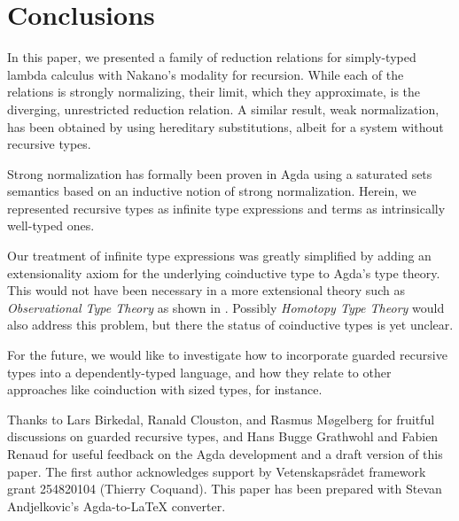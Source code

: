 
\section{Conclusions}
\label{sec:concl}

In this paper, we presented a family of reduction
relations for simply-typed lambda calculus with Nakano's modality for
recursion.  While each of the relations is strongly normalizing, their
limit, which they approximate, is the diverging, unrestricted
reduction relation.  A similar result, weak normalization, has been obtained by
\cite{krishnaswamiBenton:icfp11}
using hereditary substitutions, albeit
for a system without recursive types.

Strong normalization has formally been proven in Agda using a
saturated sets semantics based on an inductive notion of strong
normalization.  Herein, we represented recursive types as infinite
type expressions and terms as intrinsically well-typed ones.

Our treatment of infinite type expressions was greatly simplified by
adding an extensionality axiom for the underlying coinductive type to
Agda's type theory.  This would not have been necessary in a more
extensional theory such as \emph{Observational Type Theory}
\citep{altenkirchMcBrideSwierstra:plpv07} as shown in \citep{mcBride:calco09}.  Possibly \emph{Homotopy Type
Theory} \citep{hott}
would also address this problem, but there the status of
coinductive types is yet unclear.

For the future, we would like to investigate how to incorporate
guarded recursive types into a dependently-typed language, and how
they relate to other approaches like coinduction with sized
types, for instance.

Thanks to Lars Birkedal, Ranald Clouston, and Rasmus M\o{}gelberg for
fruitful discussions on guarded recursive types, and Hans Bugge
Grathwohl and Fabien Renaud for useful feedback on the Agda
development and a draft version of this paper.
The first author acknowledges support by Vetenskapsr\aa{}det framework
grant 254820104 (Thierry Coquand).  This paper has been prepared with
Stevan Andjelkovic's Agda-to-LaTeX converter.


